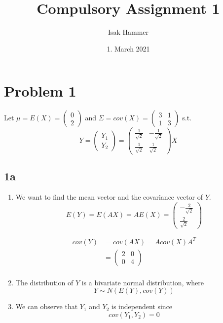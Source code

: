 \documentclass{article}
\title{Compulsory Assignment 1}
\author{Isak Hammer }
\date{1. March 2021}
\theoremstyle{remark}
\begin{document}
\maketitle
\tableofcontents
\newpage

\newpage
\section*{Problem 1}%
\label{sec:problem_1}

Let $\mu = E\left( X \right) = \begin{pmatrix}
0 \\
2
\end{pmatrix}
$
and $\Sigma  = cov \left( X \right) = \begin{pmatrix}
3 & 1 \\
1 & 3
\end{pmatrix}
$
s.t. \[
Y = \begin{pmatrix}
Y_{1} \\
Y_{2}
\end{pmatrix}
= \begin{pmatrix}
\frac{1}{\sqrt{2} } & -  \frac{1}{\sqrt{2} } \\
\frac{1}{\sqrt{2} } &  \frac{1}{\sqrt{2} }
\end{pmatrix}X
\]

\subsection*{ 1a}%
\label{sub:_a}

\begin{enumerate}[label=(\roman*)]
    \item We want to find the mean vector and the covariance vector of $Y$.
        \[
        E\left( Y \right) = E\left( AX \right) = AE\left( X \right) = \begin{pmatrix}
    -\frac{2}{\sqrt{2} } \\
    \frac{2}{\sqrt{2} }
    \end{pmatrix}
        \]

    \[
        \begin{split}
        cov\left( Y \right)  &=  cov \left( AX \right) = A cov\left( X \right) A^{T} \\
        &=  \begin{pmatrix}
        2 & 0 \\
        0 & 4
        \end{pmatrix}
         \\
        \end{split}
    \]
\item The distribution of $Y$ is a bivariate normal distribution, where \[
Y \sim  N\left( E\left( Y \right), cov\left( Y \right) \right)
\]
\item We can observe that $Y_{1}$ and $Y_{2}$  is independent since \[
cov \left( Y_{1}, Y_{2} \right) = 0
\]
\end{enumerate}
\end{document}
